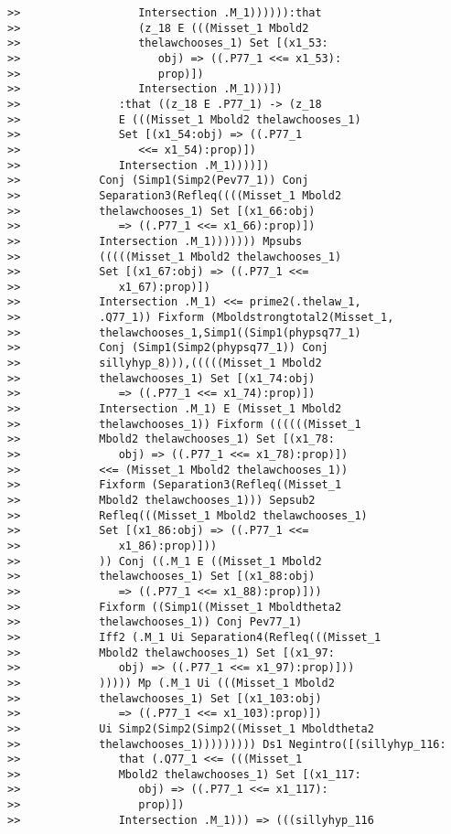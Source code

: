 \documentclass[12pt]{article}
\begin{document}
\begin{verbatim}
>>                  Intersection .M_1)))))):that
>>                  (z_18 E (((Misset_1 Mbold2
>>                  thelawchooses_1) Set [(x1_53:
>>                     obj) => ((.P77_1 <<= x1_53):
>>                     prop)])
>>                  Intersection .M_1)))])
>>               :that ((z_18 E .P77_1) -> (z_18
>>               E (((Misset_1 Mbold2 thelawchooses_1)
>>               Set [(x1_54:obj) => ((.P77_1
>>                  <<= x1_54):prop)])
>>               Intersection .M_1))))])
>>            Conj (Simp1(Simp2(Pev77_1)) Conj
>>            Separation3(Refleq((((Misset_1 Mbold2
>>            thelawchooses_1) Set [(x1_66:obj)
>>               => ((.P77_1 <<= x1_66):prop)])
>>            Intersection .M_1))))))) Mpsubs
>>            (((((Misset_1 Mbold2 thelawchooses_1)
>>            Set [(x1_67:obj) => ((.P77_1 <<=
>>               x1_67):prop)])
>>            Intersection .M_1) <<= prime2(.thelaw_1,
>>            .Q77_1)) Fixform (Mboldstrongtotal2(Misset_1,
>>            thelawchooses_1,Simp1((Simp1(phypsq77_1)
>>            Conj (Simp1(Simp2(phypsq77_1)) Conj
>>            sillyhyp_8))),(((((Misset_1 Mbold2
>>            thelawchooses_1) Set [(x1_74:obj)
>>               => ((.P77_1 <<= x1_74):prop)])
>>            Intersection .M_1) E (Misset_1 Mbold2
>>            thelawchooses_1)) Fixform ((((((Misset_1
>>            Mbold2 thelawchooses_1) Set [(x1_78:
>>               obj) => ((.P77_1 <<= x1_78):prop)])
>>            <<= (Misset_1 Mbold2 thelawchooses_1))
>>            Fixform (Separation3(Refleq((Misset_1
>>            Mbold2 thelawchooses_1))) Sepsub2
>>            Refleq(((Misset_1 Mbold2 thelawchooses_1)
>>            Set [(x1_86:obj) => ((.P77_1 <<=
>>               x1_86):prop)]))
>>            )) Conj ((.M_1 E ((Misset_1 Mbold2
>>            thelawchooses_1) Set [(x1_88:obj)
>>               => ((.P77_1 <<= x1_88):prop)]))
>>            Fixform ((Simp1((Misset_1 Mboldtheta2
>>            thelawchooses_1)) Conj Pev77_1)
>>            Iff2 (.M_1 Ui Separation4(Refleq(((Misset_1
>>            Mbold2 thelawchooses_1) Set [(x1_97:
>>               obj) => ((.P77_1 <<= x1_97):prop)]))
>>            ))))) Mp (.M_1 Ui (((Misset_1 Mbold2
>>            thelawchooses_1) Set [(x1_103:obj)
>>               => ((.P77_1 <<= x1_103):prop)])
>>            Ui Simp2(Simp2(Simp2((Misset_1 Mboldtheta2
>>            thelawchooses_1))))))))) Ds1 Negintro([(sillyhyp_116:
>>               that (.Q77_1 <<= (((Misset_1
>>               Mbold2 thelawchooses_1) Set [(x1_117:
>>                  obj) => ((.P77_1 <<= x1_117):
>>                  prop)])
>>               Intersection .M_1))) => (((sillyhyp_116

\end{verbatim}
\end{document}
